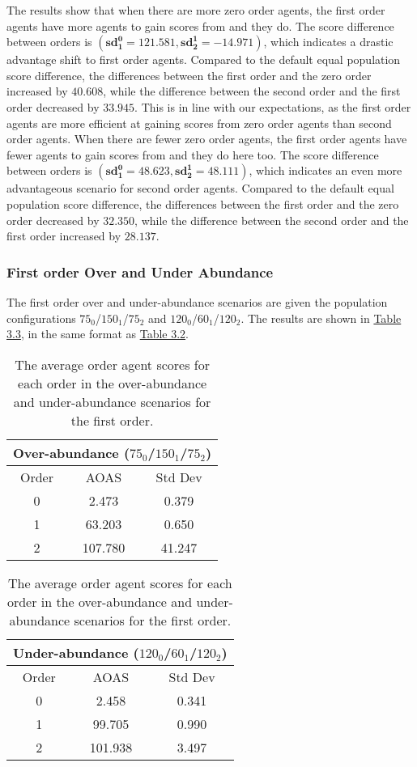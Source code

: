 The results show that when there are more zero order agents, the first order agents have more agents to gain scores from and they do. The score difference between orders is $(\mathbf{sd^0_1 = 121.581}, \mathbf{sd^1_2 = -14.971})$, which indicates a drastic advantage shift to first order agents. Compared to the default equal population score difference, the differences between the first order and the zero order increased by $\mathbf{40.608}$, while the difference between the second order and the first order decreased by $\mathbf{33.945}$. This is in line with our expectations, as the first order agents are more efficient at gaining scores from zero order agents than second order agents. When there are fewer zero order agents, the first order agents have fewer agents to gain scores from and they do here too. The score difference between orders is $(\mathbf{sd^0_1 = 48.623}, \mathbf{sd^1_2 = 48.111})$, which indicates an even more advantageous scenario for second order agents. Compared to the default equal population score difference, the differences between the first order and the zero order decreased by $\mathbf{32.350}$, while the difference between the second order and the first order increased by $\mathbf{28.137}$. 

\subsubsection{First order Over and Under Abundance}

The first order over and under-abundance scenarios are given the population configurations $75_{0}$/$150_{1}$/$75_{2}$ and $120_{0}$/$60_{1}$/$120_{2}$. The results are shown in \hyperref[table:non-sig-first-order-simple]{Table 3.3}, in the same format as \hyperref[table:non-sig-zero-order-simple]{Table 3.2}.

\begin{table}[h]
\centering
\begin{tabular}{|c|c|c|}
\hline
\multicolumn{3}{|c|}{Over-abundance ($75_{0}$/$150_{1}$/$75_{2}$)} \\
\hline
Order & AOAS & Std Dev \\
\hline
0     & 2.473    & 0.379    \\
1     & 63.203   & 0.650    \\
2     & 107.780  & 41.247   \\
\hline
\end{tabular}
\qquad
\begin{tabular}{|c|c|c|}
\hline
\multicolumn{3}{|c|}{Under-abundance ($120_{0}$/$60_{1}$/$120_{2}$)} \\
\hline
Order & AOAS & Std Dev \\
\hline
0     & 2.458   & 0.341  \\
1     & 99.705  & 0.990  \\
2     & 101.938 & 3.497  \\
\hline
\end{tabular}
\caption{The average order agent scores for each order in the over-abundance and under-abundance scenarios for the first order.}
\label{table:non-sig-first-order-simple}
\end{table}

